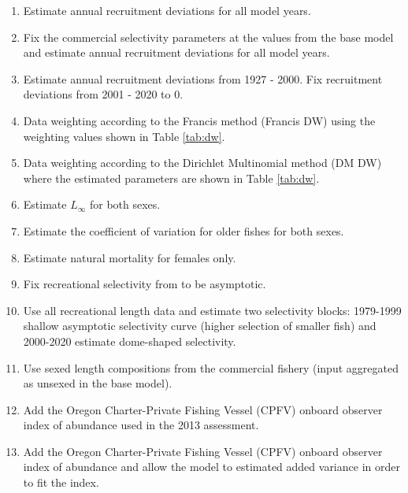 \documentclass[11pt,
  english,
  a4paper,
]{article}
\begin{document}
\begin{enumerate}
   
  \item Estimate annual recruitment deviations for all model years.

  \item Fix the commercial selectivity parameters at the values from the base model and estimate annual recruitment deviations for all model years.

  \item Estimate annual recruitment deviations from 1927 - 2000. Fix recruitment deviations from 2001 - 2020 to 0.

  \item Data weighting according to the Francis method (Francis DW) using the weighting values shown in Table \ref{tab:dw}. 
  
  \item Data weighting according to the Dirichlet Multinomial method (DM DW) where the estimated parameters are shown in Table \ref{tab:dw}. 

  \item Estimate $L_{\infty}$ for both sexes.

  \item Estimate the coefficient of variation for older fishes for both sexes.

  \item Estimate natural mortality for females only.

  \item Fix recreational selectivity from to be asymptotic. 

  \item Use all recreational length data and estimate two selectivity blocks: 1979-1999 shallow asymptotic selectivity curve (higher selection of smaller fish) and 2000-2020 estimate dome-shaped selectivity.   

  \item Use sexed length compositions from the commercial fishery (input aggregated as unsexed in the base model).

  \item Add the Oregon Charter-Private Fishing Vessel (CPFV) onboard observer index of abundance used in the 2013 assessment.

  \item Add the Oregon Charter-Private Fishing Vessel (CPFV) onboard observer index of abundance and allow the model to estimated added variance in order to fit the index.

\end{enumerate}
\end{document}
